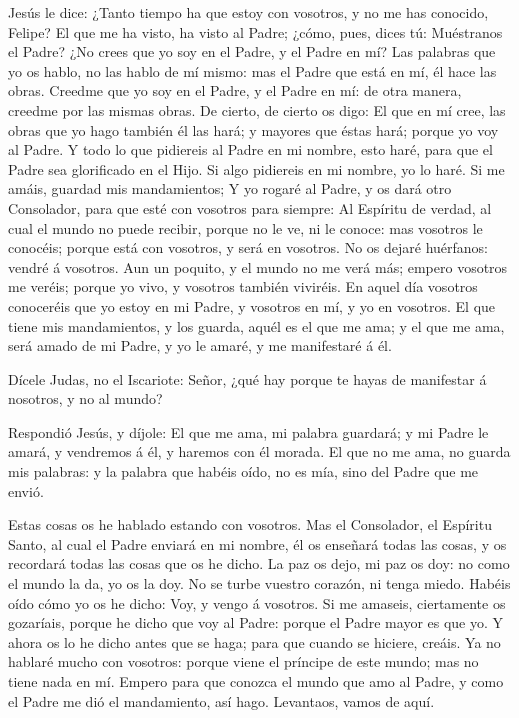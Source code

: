  Jesús le dice: ¿Tanto tiempo ha que estoy con vosotros, y
no me has conocido, Felipe? El que me ha visto, ha visto al Padre;
¿cómo, pues, dices tú: Muéstranos el Padre?  ¿No crees que
yo soy en el Padre, y el Padre en mí? Las palabras que yo os hablo, no
las hablo de mí mismo: mas el Padre que está en mí, él hace las obras.
 Creedme que yo soy en el Padre, y el Padre en mí: de otra
manera, creedme por las mismas obras.  De cierto, de cierto
os digo: El que en mí cree, las obras que yo hago también él las hará; y
mayores que éstas hará; porque yo voy al Padre.  Y todo lo
que pidiereis al Padre en mi nombre, esto haré, para que el Padre sea
glorificado en el Hijo.  Si algo pidiereis en mi nombre, yo
lo haré.  Si me amáis, guardad mis mandamientos;
 Y yo rogaré al Padre, y os dará otro Consolador, para que
esté con vosotros para siempre:  Al Espíritu de verdad, al
cual el mundo no puede recibir, porque no le ve, ni le conoce: mas
vosotros le conocéis; porque está con vosotros, y será en vosotros.
 No os dejaré huérfanos: vendré á vosotros. 
Aun un poquito, y el mundo no me verá más; empero vosotros me veréis;
porque yo vivo, y vosotros también viviréis.  En aquel día
vosotros conoceréis que yo estoy en mi Padre, y vosotros en mí, y yo en
vosotros.  El que tiene mis mandamientos, y los guarda,
aquél es el que me ama; y el que me ama, será amado de mi Padre, y yo le
amaré, y me manifestaré á él.

 Dícele Judas, no el Iscariote: Señor, ¿qué hay porque te
hayas de manifestar á nosotros, y no al mundo?

 Respondió Jesús, y díjole: El que me ama, mi palabra
guardará; y mi Padre le amará, y vendremos á él, y haremos con él
morada.  El que no me ama, no guarda mis palabras: y la
palabra que habéis oído, no es mía, sino del Padre que me envió.

 Estas cosas os he hablado estando con vosotros.
 Mas el Consolador, el Espíritu Santo, al cual el Padre
enviará en mi nombre, él os enseñará todas las cosas, y os recordará
todas las cosas que os he dicho.  La paz os dejo, mi paz os
doy: no como el mundo la da, yo os la doy. No se turbe vuestro corazón,
ni tenga miedo.  Habéis oído cómo yo os he dicho: Voy, y
vengo á vosotros. Si me amaseis, ciertamente os gozaríais, porque he
dicho que voy al Padre: porque el Padre mayor es que yo.  Y
ahora os lo he dicho antes que se haga; para que cuando se hiciere,
creáis.  Ya no hablaré mucho con vosotros: porque viene el
príncipe de este mundo; mas no tiene nada en mí.  Empero
para que conozca el mundo que amo al Padre, y como el Padre me dió el
mandamiento, así hago. Levantaos, vamos de aquí.

